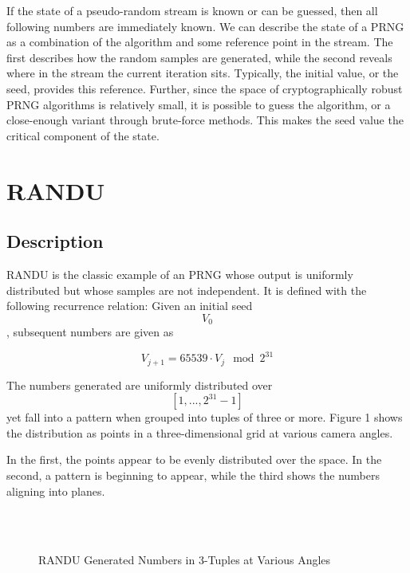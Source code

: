 \documentclass[conference]{/Users/paul/MSEE/ee595/project/report/IEEEtran/IEEEtran}
\begin{document}
If the state of a pseudo-random stream is known or can be guessed, then all 
following numbers are immediately known. We can describe the state of a PRNG as 
a combination of the algorithm and some reference point in the stream. The first 
describes how the random samples are generated, while the second reveals where 
in the stream the current iteration sits. Typically, the initial value, or the 
seed, provides this reference. Further, since the space of cryptographically 
robust PRNG algorithms is relatively small, it is possible to guess the 
algorithm, or a close-enough variant through brute-force methods. This makes the 
seed value the critical component of the state. 
 
\section{RANDU}
 
\subsection{Description}
RANDU is the classic example of an PRNG whose output is uniformly distributed but
whose samples are not independent. It is defined with the following recurrence 
relation:
    Given an initial seed $$V_0$$, subsequent numbers are given as
 
\begin{equation}
    V_{j+1} = 65539 \cdot V_j \mod 2^{31}
\end{equation}
 
The numbers generated are uniformly distributed over $$[1,...,2^{31} - 1]$$
yet fall into a pattern when grouped into tuples of three or more. Figure 1 shows
the distribution as points in a three-dimensional grid at various camera angles.

In the first, the points appear to be evenly distributed over the space. In the
second, a pattern is beginning to appear, while the third shows the numbers 
aligning into planes. 

\begin{figure}[h]
    \captionsetup{width=0.5\linewidth}
     \\[-2ex]
     \\[-2ex]
    \caption{RANDU Generated Numbers in 3-Tuples at Various Angles}
\end{figure}
\end{document}
